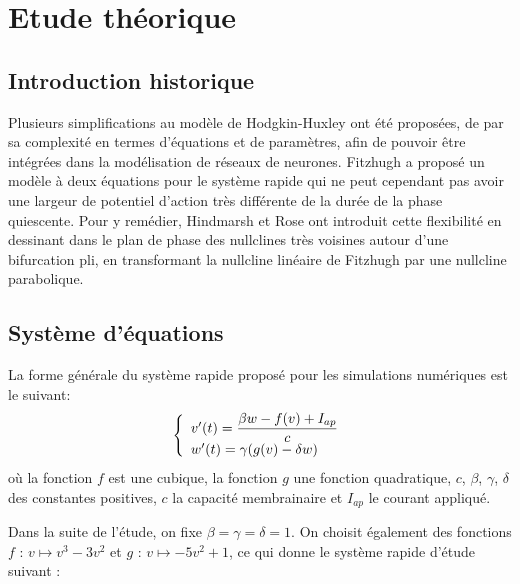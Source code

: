 \documentclass[12pt,a4paper,onecolumn]{article}
\begin{document}


\newpage
\tableofcontents

\newpage

\section{Etude théorique}

\subsection{Introduction historique}

Plusieurs simplifications au modèle de Hodgkin-Huxley \cite{hodgkin1952quantitative} ont été proposées, de par sa complexité en termes d'équations et de paramètres, afin de pouvoir être intégrées dans la modélisation de réseaux de neurones. Fitzhugh a proposé un modèle \cite{fitzhugh1961impulses} à deux équations pour le système rapide qui ne peut cependant pas avoir une largeur de potentiel d'action très différente de la durée de la phase quiescente. Pour y remédier, Hindmarsh et Rose ont introduit cette flexibilité \cite{hindmarsh1982model} en dessinant dans le plan de phase des nullclines très voisines autour d'une bifurcation pli, en transformant la nullcline linéaire de Fitzhugh par une nullcline parabolique.

\subsection{Système d'équations}

La forme générale du système rapide proposé \cite{hindmarsh1984model} pour les simulations numériques est le suivant:
$$
\displaystyle{\left\{
\begin{array}{l l}
v'(t)= \displaystyle{\frac{\beta w -f(v) + I_{ap}}{c}}\\
w'(t) = \gamma (g(v) - \delta w)\\
\end{array}
\right.}
$$
où la fonction $f$ est une cubique, la fonction $g$ une fonction quadratique, $c$, $\beta$, $\gamma$, $\delta$ des constantes positives, $c$ la capacité membrainaire et $I_{ap}$ le courant appliqué.

Dans la suite de l'étude, on fixe $\beta = \gamma = \delta = 1$. On choisit également des fonctions $f$ : $v \longmapsto v^3 - 3v^2$ et $g$ : $v \longmapsto -5v^2 + 1$, ce qui donne le système rapide d'étude suivant :
\end{document}
